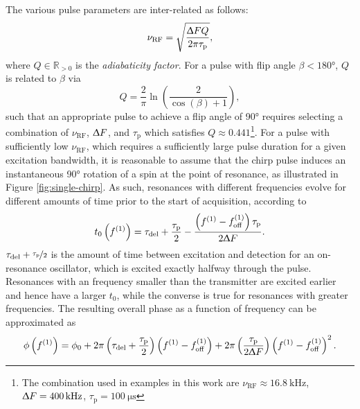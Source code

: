 The various pulse parameters are inter-related as follows:
\begin{equation}
    \nu_{\text{RF}} = \sqrt{
        \frac{\Updelta F Q}{2 \pi \tau_{\text{p}}}
    },
\end{equation}
where $Q \in \mathbb{R}_{>0}$ is the \emph{adiabaticity factor}\cite{Kupce1995b}.
For a pulse with flip angle  $\beta < \ang{180}$, $Q$ is related to $\beta$ via
\begin{equation}
    Q = \frac{2}{\pi} \ln \left( \frac{2}{\cos(\beta) + 1} \right),
\end{equation}
such that an appropriate pulse to achieve a flip angle of \ang{90} requires
selecting a combination of $\nu_{\text{RF}}$, $\Updelta F$, and
$\tau_{\text{p}}$ which satisfies $Q \approx 0.441$\footnote{
    The combination used in examples in this work are
    $\nu_{\text{RF}} \approx \qty{16.8}{\kilo\hertz}$,
    $\Updelta F = \qty{400}{\kilo\hertz}$,
    $\tau_{\text{p}} = \qty{100}{\micro\second}$
}.
For a pulse with sufficiently low $\nu_{\text{RF}}$, which requires a
sufficiently large pulse duration for a given excitation bandwidth, it is
reasonable to assume that the chirp pulse induces an instantaneous \ang{90}
rotation
of a spin at the point of resonance, as illustrated in Figure
\ref{fig:single-chirp}. As such, resonances with different
frequencies evolve for different amounts of time prior to the start of
acquisition, according to
\begin{equation}
    t_0\left( f^{(1)} \right) =
        \tau_{\text{del}} + \frac{\tau_{\text{p}}}{2} -
        \frac{\left( f^{(1)} - f_{\mathrm{off}}^{(1)} \right) \tau_{\text{p}}}{2 \Updelta F}.
    \label{eq:t0}
\end{equation}
$\tau_{\text{del}} + \nicefrac{\tau_{\text{p}}}{2}$ is the amount of time
between excitation and detection for an on-resonance oscillator, which is
excited exactly halfway through the pulse. Resonances
with an frequency smaller than the transmitter are excited earlier and hence
have a larger $t_0$, while the converse is true for resonances with greater
frequencies. The resulting overall phase as a function of frequency can be
approximated as\cite{Foroozandeh2019}
\begin{equation}
    \phi \left( f^{(1)} \right) =
        \phi_0 +
        2 \pi  \left(\tau_{\text{del}} + \frac{\tau_{\text{p}}}{2} \right)
        \left(f^{(1)} - f_{\mathrm{off}}^{(1)}\right) +
        2 \pi \left( \frac{\tau_{\text{p}}}{2 \Updelta F} \right)
        \left(f^{(1)} - f_{\mathrm{off}}^{(1)}\right)^2.
    \label{eq:quadratic-phase}
\end{equation}
